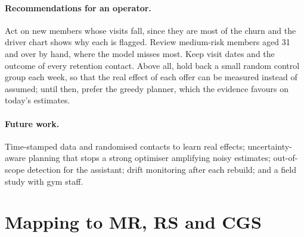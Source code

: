 \documentclass[paper=a4, fontsize=11pt, open=any, parskip=half-,
  headings=small, numbers=noenddot, captions=tableheading, toc=flat]{scrreprt}
\renewcommand{\thesection}{\arabic{section}}
\begin{document}
\paragraph{Recommendations for an operator.} Act on new members whose visits fall, since they are most of the churn and the driver chart shows why each is flagged. Review medium-risk members aged 31 and over by hand, where the model misses most. Keep visit dates and the outcome of every retention contact. Above all, hold back a small random control group each week, so that the real effect of each offer can be measured instead of assumed; until then, prefer the greedy planner, which the evidence favours on today's estimates.

\paragraph{Future work.} Time-stamped data and randomised contacts to learn real effects; uncertainty-aware planning that stops a strong optimiser amplifying noisy estimates; out-of-scope detection for the assistant; drift monitoring after each rebuild; and a field study with gym staff.

\printbibliography[heading=shortbib, title=References]

\clearpage
\renewcommand{\thesection}{\Alph{section}}
\renewcommand{\theHsection}{appendix.\Alph{section}}
\setcounter{section}{0}




\section{Mapping to MR, RS and CGS}
\label{app:mapping}
\end{document}
